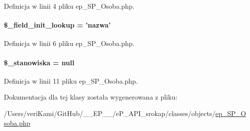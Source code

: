 Definicja w linii 4 pliku ep\-\_\-\-S\-P\-\_\-\-Osoba.\-php.

\hypertarget{classep___s_p___osoba_a4a4d54ae35428077a7c61ec8a5139af3}{
\paragraph[{\$\-\_\-field\-\_\-init\-\_\-lookup}]{\setlength{\rightskip}{0pt plus 5cm}\$\-\_\-field\-\_\-init\-\_\-lookup = 'nazwa'}}\label{classep___s_p___osoba_a4a4d54ae35428077a7c61ec8a5139af3}


Definicja w linii 6 pliku ep\-\_\-\-S\-P\-\_\-\-Osoba.\-php.

\hypertarget{classep___s_p___osoba_a1192326d568efecaa005d7af560a56aa}{
\paragraph[{\$\-\_\-stanowiska}]{\setlength{\rightskip}{0pt plus 5cm}\$\-\_\-stanowiska = null\hspace{0.3cm}{\ttfamily [protected]}}}\label{classep___s_p___osoba_a1192326d568efecaa005d7af560a56aa}


Definicja w linii 11 pliku ep\-\_\-\-S\-P\-\_\-\-Osoba.\-php.



Dokumentacja dla tej klasy została wygenerowana z pliku\-:\begin{DoxyCompactItemize}
\item 
/\-Users/veri\-Kami/\-Git\-Hub/\-\_\-\-\_\-\-E\-P\-\_\-\-\_\-/e\-P\-\_\-\-A\-P\-I\-\_\-srokap/classes/objects/\hyperlink{ep___s_p___osoba_8php}{ep\-\_\-\-S\-P\-\_\-\-Osoba.\-php}\end{DoxyCompactItemize}
